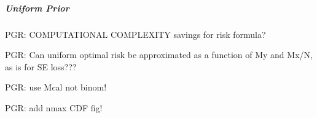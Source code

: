 \documentclass[12pt]{article}
\DeclareMathOperator{\Prm}{\mathrm{P}}
\begin{document}
%
%
%
%
%
%
%
%



\subparagraph{Uniform Prior}

PGR: COMPUTATIONAL COMPLEXITY savings for risk formula?

PGR: Can uniform optimal risk be approximated as a function of My and Mx/N, as is for SE loss???

PGR: use Mcal not binom!

PGR: add nmax CDF fig!
\end{document}
